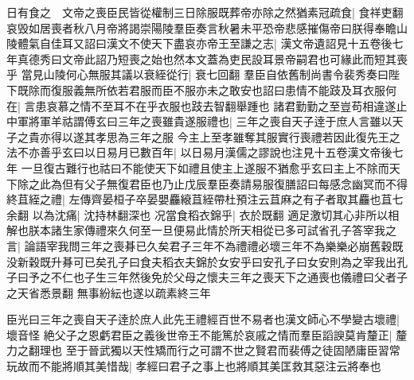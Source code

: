 日有食之　文帝之喪臣民皆從權制三日除服既葬帝亦除之然猶素冠疏食|{
	食祥吏翻}
哀毁如居喪者秋八月帝將謁崇陽陵羣臣奏言秋暑未平恐帝悲感摧傷帝曰朕得奉瞻山陵體氣自佳耳又詔曰漢文不使天下盡哀亦帝王至謙之志|{
	漢文帝遺詔見十五卷後七年真德秀曰文帝此詔乃短喪之始也然本文蓋為吏民設耳景帝嗣君也可緣此而短其喪乎}
當見山陵何心無服其議以衰絰從行|{
	衰七回翻}
羣臣自依舊制尚書令裴秀奏曰陛下既除而復服義無所依若君服而臣不服亦未之敢安也詔曰患情不能跂及耳衣服何在|{
	言患哀慕之情不至耳不在乎衣服也跂去智翻舉踵也}
諸君勤勤之至豈苟相違遂止中軍將軍羊祜謂傅玄曰三年之喪雖貴遂服禮也|{
	三年之喪自天子逹于庶人言雖以天子之貴亦得以遂其孝思為三年之服}
今主上至孝雖奪其服實行喪禮若因此復先王之法不亦善乎玄曰以日易月已數百年|{
	以日易月漢儒之謬說也注見十五卷漢文帝後七年}
一旦復古難行也祜曰不能使天下如禮且使主上遂服不猶愈乎玄曰主上不除而天下除之此為但有父子無復君臣也乃止戊辰羣臣奏請易服復膳詔曰每感念幽冥而不得終苴絰之禮|{
	左傳齊晏桓子卒晏嬰麤縗苴絰帶杜預注云苴麻之有子者取其麤也苴七余翻}
以為沈痛|{
	沈持林翻深也}
况當食稻衣錦乎|{
	衣於既翻}
適足激切其心非所以相解也朕本諸生家傳禮來久何至一旦便易此情於所天相從已多可試省孔子答宰我之言|{
	論語宰我問三年之喪朞已久矣君子三年不為禮禮必壞三年不為樂樂必崩舊穀既没新穀既升朞可已矣孔子曰食夫稻衣夫錦於女安乎曰安孔子曰女安則為之宰我出孔子曰予之不仁也子生三年然後免於父母之懷夫三年之喪天下之通喪也儀禮曰父者子之天省悉景翻}
無事紛紜也遂以疏素終三年

臣光曰三年之喪自天子逹於庶人此先王禮經百世不易者也漢文師心不學變古壞禮|{
	壞音怪}
絶父子之恩虧君臣之義後世帝王不能篤於哀戚之情而羣臣謟諛莫肯釐正|{
	釐力之翻理也}
至于晉武獨以天性矯而行之可謂不世之賢君而裴傅之徒固陋庸臣習常玩故而不能將順其美惜哉|{
	孝經曰君子之事上也將順其美匡救其惡注云將奉也}


